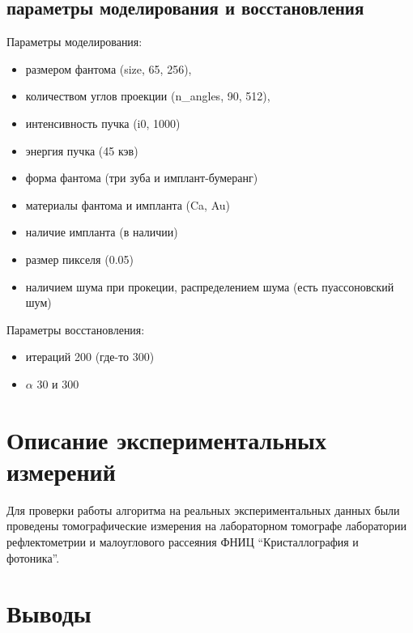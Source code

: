 \subsection{параметры моделирования и восстановления} \label{sect_2_3}
Параметры моделирования:
\begin{itemize}
  \item размером фантома (size, 65, 256),
  \item количеством углов проекции (n\_angles, 90, 512), 
  \item интенсивность пучка (i0, 1000)
  \item энергия пучка (45 кэв)
  \item форма фантома (три зуба и имплант-бумеранг)
  \item материалы фантома и импланта (Ca, Au)
  \item наличие импланта (в наличии)
  \item размер пикселя (0.05)
  \item наличием шума при прокеции, распределением шума (есть пуассоновский шум)
\end{itemize}

Параметры восстановления:
\begin{itemize}
  \item итераций 200 (где-то 300)
  \item $\alpha$ 30 и 300
\end{itemize}

\section{Описание экспериментальных измерений}
Для проверки работы алгоритма на реальных экспериментальных данных были проведены томографические измерения на лабораторном томографе лаборатории рефлектометрии и малоуглового рассеяния ФНИЦ ``Кристаллография и фотоника''.


\section{Выводы}
